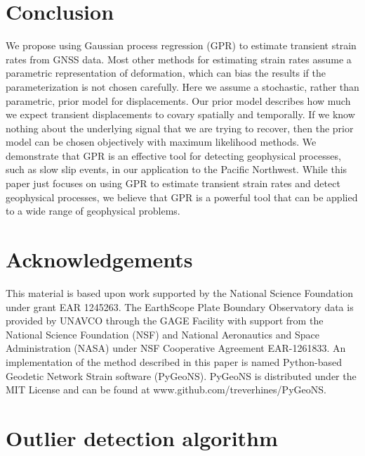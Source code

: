 \documentclass[extra,mreferee]{gji}
\begin{document}
\section{Conclusion}\label{sec:Conclusion}

We propose using Gaussian process regression (GPR) to estimate
transient strain rates from GNSS data. Most other methods for
estimating strain rates assume a parametric representation of
deformation, which can bias the results if the parameterization is not
chosen carefully. Here we assume a stochastic, rather than parametric,
prior model for displacements. Our prior model describes how much we
expect transient displacements to covary spatially and temporally. If
we know nothing about the underlying signal that we are trying to
recover, then the prior model can be chosen objectively with maximum
likelihood methods. We demonstrate that GPR is an effective tool for
detecting geophysical processes, such as slow slip events, in our
application to the Pacific Northwest. While this paper just focuses on
using GPR to estimate transient strain rates and detect geophysical
processes, we believe that GPR is a powerful tool that can be applied
to a wide range of geophysical problems.

\section{Acknowledgements}
This material is based upon work supported by the National Science
Foundation under grant EAR 1245263. The EarthScope Plate Boundary
Observatory data is provided by UNAVCO through the GAGE Facility with
support from the National Science Foundation (NSF) and National
Aeronautics and Space Administration (NASA) under NSF Cooperative
Agreement EAR-1261833. An implementation of the method described in
this paper is named Python-based Geodetic Network Strain software
(PyGeoNS). PyGeoNS is distributed under the MIT License and can be
found at www.github.com/treverhines/PyGeoNS.

\appendix
\section{Outlier detection algorithm}
\end{document}
